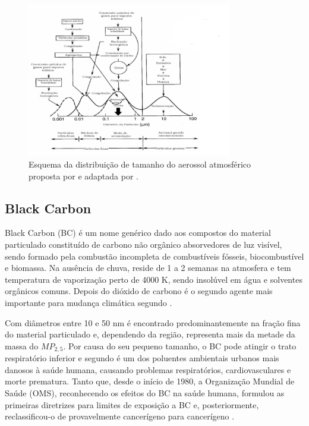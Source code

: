 \begin{figure}[H]
  \centering
  \includegraphics[width=0.8\textwidth]{../inputs/images/modas_aerossol.png}
  \caption{Esquema da distribuição de tamanho do aerossol atmosférico proposta
           por \citet{finlayson1999} e adaptada por \citet{oliveira2007}.
           \label{fig:modas_aerossol}}
\end{figure}

\subsection{Black Carbon}

Black Carbon (BC) é um nome genérico dado aos compostos do material particulado 
constituído de carbono não orgânico absorvedores de luz visível, sendo
formado pela combustão incompleta de combustíveis fósseis, biocombustível e 
biomassa. Na ausência de chuva, reside de 1 a 2 semanas na atmosfera e tem 
temperatura de vaporização perto de 4000 K, sendo insolúvel em água e solventes 
orgânicos comuns. Depois do dióxido de carbono é o segundo agente mais 
importante para mudança climática segundo \citet{bond2013}.

Com diâmetros entre 10 e 50 nm é encontrado predominantemente na fração fina do 
material particulado e, dependendo da região, representa mais da metade 
da massa do $MP_{2,5}$. Por causa do seu pequeno tamanho, o BC pode atingir o 
trato respiratório inferior e segundo \citet{jacobson2014} é um dos poluentes
ambientais urbanos mais danosos à saúde humana, causando problemas 
respiratórios, cardiovasculares e morte prematura. Tanto que, desde o início 
de 1980, a Organização Mundial de Saúde (OMS), reconhecendo os efeitos do BC na 
saúde humana, formulou as primeiras diretrizes para limites de exposição a BC e, 
posteriormente, reclassificou-o de provavelmente cancerígeno para cancerígeno 
\citep{scovronick2015}. 

